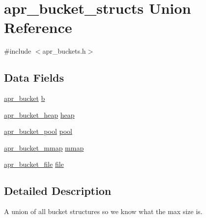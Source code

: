 \hypertarget{unionapr__bucket__structs}{\section{apr\-\_\-bucket\-\_\-structs Union Reference}
\label{unionapr__bucket__structs}
}


{\ttfamily \#include $<$apr\-\_\-buckets.\-h$>$}

\subsection*{Data Fields}
\begin{DoxyCompactItemize}
\item 
\hyperlink{structapr__bucket}{apr\-\_\-bucket} \hyperlink{unionapr__bucket__structs_a840c42a20727de2e4534ca05f1f6c990}{b}
\item 
\hyperlink{structapr__bucket__heap}{apr\-\_\-bucket\-\_\-heap} \hyperlink{unionapr__bucket__structs_a5335dc82d8250e511a9c55e5fea97141}{heap}
\item 
\hyperlink{structapr__bucket__pool}{apr\-\_\-bucket\-\_\-pool} \hyperlink{unionapr__bucket__structs_ab926fe2af7c1780c03bf1669766db4a1}{pool}
\item 
\hyperlink{structapr__bucket__mmap}{apr\-\_\-bucket\-\_\-mmap} \hyperlink{unionapr__bucket__structs_a627c4ca697f06bbf4226c8c2acd93cbc}{mmap}
\item 
\hyperlink{structapr__bucket__file}{apr\-\_\-bucket\-\_\-file} \hyperlink{unionapr__bucket__structs_ab339255acdf750133759a0d67b3f2e30}{file}
\end{DoxyCompactItemize}


\subsection{Detailed Description}
A union of all bucket structures so we know what the max size is. 

